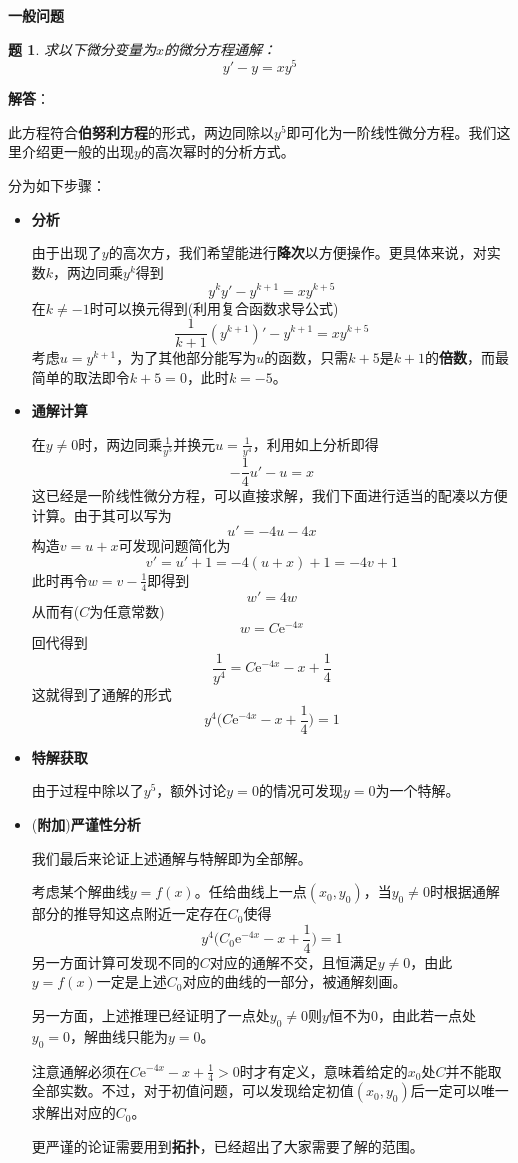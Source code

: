 \documentclass[a4paper,UTF8,fontset=windows,AutoFakeBold]{ctexart}
\newcommand*{\er}{\mathrm{e}}
\newcommand*{\extra}{\textbf{附加}}
\newcommand*{\note}{\noindent *}
\theoremstyle{ex}
\newtheorem{exercise}{题}
\newcommand{\sol}[1]{{\vspace{5pt}\kaishu\noindent\textbf{解答}：\vspace{-3pt}
\begin{compactitem}
    \item[] #1
\end{compactitem}
}}
\begin{document}
\noindent\textbf{一般问题}
\begin{framed}
\begin{exercise}
    求以下微分变量为$x$的微分方程通解：
    $$y'-y=xy^5$$
\end{exercise}
\sol{
    \note 此方程符合\textbf{伯努利方程}的形式，两边同除以$y^5$即可化为一阶线性微分方程。我们这里介绍更一般的出现$y$的高次幂时的分析方式。

    分为如下步骤：
    \begin{itemize}
        \item \textbf{分析}
        
        由于出现了$y$的高次方，我们希望能进行\textbf{降次}以方便操作。更具体来说，对实数$k$，两边同乘$y^k$得到
        $$y^ky'-y^{k+1}=xy^{k+5}$$
        在$k\ne-1$时可以换元得到(利用复合函数求导公式)
        $$\frac{1}{k+1}(y^{k+1})'-y^{k+1}=xy^{k+5}$$
        考虑$u=y^{k+1}$，为了其他部分能写为$u$的函数，只需$k+5$是$k+1$的\textbf{倍数}，而最简单的取法即令$k+5=0$，此时$k=-5$。

        \item \textbf{通解计算}
        
        在$y\ne0$时，两边同乘$\frac{1}{y^5}$并换元$u=\frac{1}{y^4}$，利用如上分析即得
        $$-\frac{1}{4}u'-u=x$$
        这已经是一阶线性微分方程，可以直接求解，我们下面进行适当的配凑以方便计算。由于其可以写为
        $$u'=-4u-4x$$
        构造$v=u+x$可发现问题简化为
        $$v'=u'+1=-4(u+x)+1=-4v+1$$
        此时再令$w=v-\frac{1}{4}$即得到
        $$w'=4w$$
        从而有($C$为任意常数)
        $$w=C\er^{-4x}$$
        回代得到
        $$\frac{1}{y^4}=C\er^{-4x}-x+\frac{1}{4}$$
        这就得到了通解的形式
        $$y^4\bigg(C\er^{-4x}-x+\frac{1}{4}\bigg)=1$$

        \item \textbf{特解获取}
        
        由于过程中除以了$y^5$，额外讨论$y=0$的情况可发现$y=0$为一个特解。

        \item (\extra)\textbf{严谨性分析}
        
        我们最后来论证上述通解与特解即为全部解。

        考虑某个解曲线$y=f(x)$。任给曲线上一点$(x_0,y_0)$，当$y_0\ne0$时根据通解部分的推导知这点附近一定存在$C_0$使得
        $$y^4\bigg(C_0\er^{-4x}-x+\frac{1}{4}\bigg)=1$$
        另一方面计算可发现不同的$C$对应的通解不交，且恒满足$y\ne0$，由此$y=f(x)$一定是上述$C_0$对应的曲线的一部分，被通解刻画。

        另一方面，上述推理已经证明了一点处$y_0\ne0$则$y$恒不为0，由此若一点处$y_0=0$，解曲线只能为$y=0$。

        \note 注意通解必须在$C\er^{-4x}-x+\frac{1}{4}>0$时才有定义，意味着给定的$x_0$处$C$并不能取全部实数。不过，对于初值问题，可以发现给定初值$(x_0,y_0)$后一定可以唯一求解出对应的$C_0$。

        \note 更严谨的论证需要用到\textbf{拓扑}，已经超出了大家需要了解的范围。
    \end{itemize}
}
\end{framed}
\end{document}
